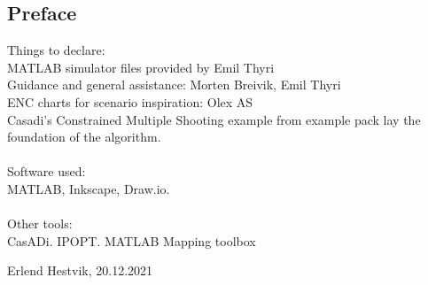 \newpage
\begin{centering}
\section*{Preface}
Things to declare:\hfill\\
MATLAB simulator files provided by Emil Thyri\\
Guidance and general assistance: Morten Breivik, Emil Thyri\\
ENC charts for scenario inspiration: Olex AS\\
Casadi's Constrained Multiple Shooting example from example pack lay the foundation of the algorithm.\\
\hfill\\
Software used:\\
MATLAB, Inkscape, Draw.io.\\
\hfill\\
Other tools:\\
CasADi. IPOPT. MATLAB Mapping toolbox


\end{centering}
\begin{center}
    Erlend Hestvik, 20.12.2021
\end{center}

\afterpage{\blankpage}